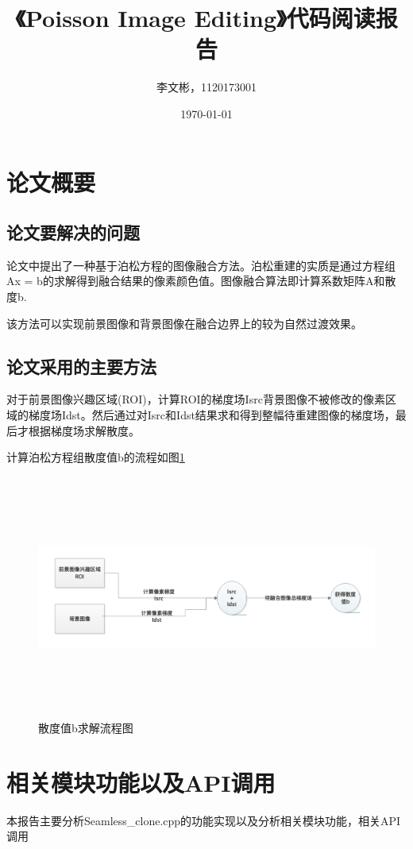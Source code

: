 \documentclass{article}
\title{《Poisson Image Editing》代码阅读报告}
\author{李文彬，1120173001}
\date{\today}
\begin{document}
	\maketitle
	\section{论文概要}
	\subsection{论文要解决的问题}
    论文中提出了一种基于泊松方程的图像融合方法。泊松重建的实质是通过方程组Ax = b的求解得到融合结果的像素颜色值。图像融合算法即计算系数矩阵A和散度b.
    
    该方法可以实现前景图像和背景图像在融合边界上的较为自然过渡效果。
  
    \subsection{论文采用的主要方法}
      对于前景图像兴趣区域(ROI)，计算ROI的梯度场Isrc背景图像不被修改的像素区域的梯度场Idst。然后通过对Isrc和Idst结果求和得到整幅待重建图像的梯度场，最后才根据梯度场求解散度。
      
     计算泊松方程组散度值b的流程如图\ref{fig.1}
    \begin{figure}[H]
        \centering
        \includegraphics[width=18.0cm,height = 8.0cm]{img/b.png} 
        \caption{散度值b求解流程图}
        \label{fig.1}
    \end{figure}
\section{相关模块功能以及API调用}
本报告主要分析Seamless_clone.cpp的功能实现以及分析相关模块功能，相关API调用
\end{document}
